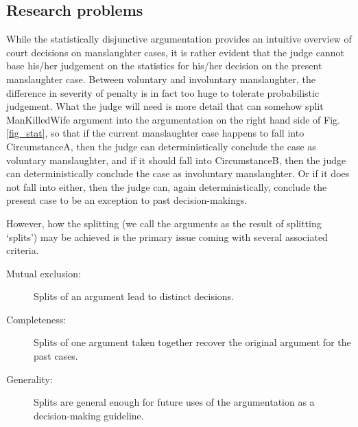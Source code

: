 \documentclass{llncs}%
\begin{document}
\subsection{Research problems} 
While the statistically disjunctive argumentation provides an intuitive overview of court decisions on manslaughter cases,  
it is rather evident that the judge cannot base his/her judgement on the statistics for his/her decision 
on the present manslaughter case. Between voluntary and involuntary manslaughter, 
the difference in severity of penalty is in fact too huge to tolerate probabilistic judgement. 
What the judge will need is more detail that can somehow split ManKilledWife argument into the argumentation 
on the right hand side 
of Fig. \ref{fig_stat}, so that if the current manslaughter case happens to fall into CircumstanceA, then 
the judge can deterministically conclude the case as voluntary manslaughter, and if 
it should fall into CircumstanceB, then the judge can deterministically conclude the case as involuntary manslaughter. 
Or if it does not fall into either, then the judge can, again deterministically, conclude the present case 
to be an exception to past decision-makings.  

However, how the splitting (we call the arguments as the result of splitting `splits') may be achieved is the primary issue coming with several associated criteria. 
\begin{description} 
	\item[Mutual exclusion:] Splits of an argument lead to distinct decisions. 
	\item[Completeness:] Splits of one argument taken together recover the original argument for the past cases. 
	\item[Generality:] Splits are general enough for future uses of the argumentation as a decision-making guideline. 
\end{description} 
\end{document}
